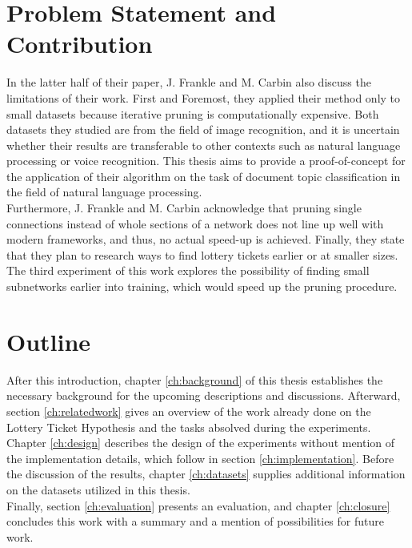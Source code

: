 \section{Problem Statement and Contribution}
In the latter half of their paper, J. Frankle and M. Carbin also discuss the limitations of their work. First and Foremost, they applied their method only to small datasets because iterative pruning is computationally expensive.\cite{LTH} Both datasets they studied are from the field of image recognition, and it is uncertain whether their results are transferable to other contexts such as natural language processing or voice recognition. This thesis aims to provide a proof-of-concept for the application of their algorithm on the task of document topic classification in the field of natural language processing.\\
Furthermore, J. Frankle and M. Carbin acknowledge that pruning single connections instead of whole sections of a network does not line up well with modern frameworks, and thus, no actual speed-up is achieved. Finally, they state that they plan to research ways to find lottery tickets earlier or at smaller sizes.\cite{LTH} The third experiment of this work explores the possibility of finding small subnetworks earlier into training, which would speed up the pruning procedure.


\section{Outline}

After this introduction, chapter \ref{ch:background} of this thesis establishes the necessary background for the upcoming descriptions and discussions. Afterward, section \ref{ch:relatedwork} gives an overview of the work already done on the Lottery Ticket Hypothesis and the tasks absolved during the experiments. Chapter \ref{ch:design} describes the design of the experiments without mention of the implementation details, which follow in section \ref{ch:implementation}. Before the discussion of the results, chapter \ref{ch:datasets} supplies additional information on the datasets utilized in this thesis.\\
Finally, section \ref{ch:evaluation} presents an evaluation, and chapter \ref{ch:closure} concludes this work with a summary and a mention of possibilities for future work.